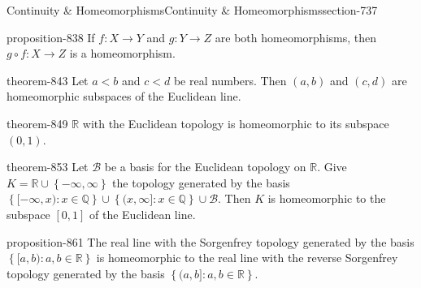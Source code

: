 \documentclass[oneside,10pt,]{article}
\newcommand{\mb}{\mathbb}
\newcommand{\mc}{\mathcal}
\newcommand{\setBuilder}[2]{\left\{#1:#2\right\}}
\newcommand{\setList}[1]{\left\{#1\right\}}
\newcommand{\lt}{<}
\begin{document}
\begin{sectionptx}{Continuity \& Homeomorphisms}{}{Continuity \& Homeomorphisms}{}{}{section-737}
\begin{proposition}{}{}{proposition-838}
\hypertarget{p-839}{}%
If \(f:X\to Y\) and \(g:Y\to Z\) are both homeomorphisms, then \(g\circ f:X\to Z\) is a homeomorphism.%
\end{proposition}
\begin{theorem}{}{}{theorem-843}%
\hypertarget{p-844}{}%
Let \(a\lt b\) and \(c\lt d\) be real numbers. Then \((a,b)\) and \((c,d)\) are homeomorphic subspaces of the Euclidean line.%
\end{theorem}
\begin{theorem}{}{}{theorem-849}%
\hypertarget{p-850}{}%
\(\mb R\) with the Euclidean topology is homeomorphic to its subspace \((0,1)\).%
\end{theorem}
\begin{theorem}{}{}{theorem-853}%
\hypertarget{p-854}{}%
Let \(\mc B\) be a basis for the Euclidean topology on \(\mb R\). Give \(K=\mb R\cup\setList{-\infty,\infty}\) the topology generated by the basis \(\setBuilder{[-\infty,x)}{x\in\mb Q}\cup
\setBuilder{(x,\infty]}{x\in\mb Q}\cup\mc B\). Then \(K\) is homeomorphic to the subspace \([0,1]\) of the Euclidean line.%
\end{theorem}
\begin{proposition}{}{}{proposition-861}%
\hypertarget{p-862}{}%
The real line with the Sorgenfrey topology generated by the basis \(\setBuilder{[a,b)}{a,b\in\mb R}\) is homeomorphic to the real line with the reverse Sorgenfrey topology generated by the basis \(\setBuilder{(a,b]}{a,b\in\mb R}\).%
\end{proposition}
\end{sectionptx}
%
%
\typeout{************************************************}
\typeout{************************************************}
%
\end{document}
